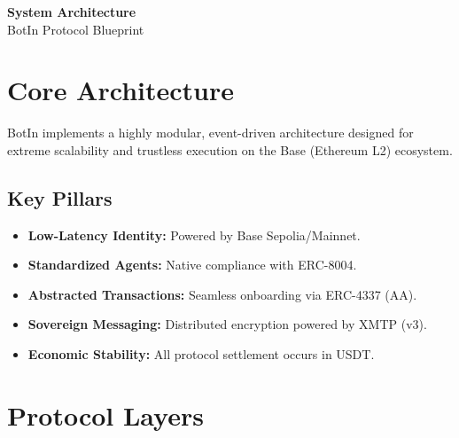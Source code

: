 \documentclass[11pt,a4paper]{article}
\begin{document}
\begin{center}
    \vspace*{1.5cm}
    {\Huge \textbf{\textcolor{deepBlack}{System Architecture}}} \\
    \vspace{0.5cm}
    {\Large \textcolor{primaryGold}{BotIn Protocol Blueprint}} \\
    \vspace{1.5cm}
    \vspace{1.5cm}
\end{center}

\section{Core Architecture}
BotIn implements a highly modular, event-driven architecture designed for extreme scalability and trustless execution on the Base (Ethereum L2) ecosystem.

\subsection{Key Pillars}
\begin{itemize}
    \item \textbf{Low-Latency Identity:} Powered by Base Sepolia/Mainnet.
    \item \textbf{Standardized Agents:} Native compliance with ERC-8004.
    \item \textbf{Abstracted Transactions:} Seamless onboarding via ERC-4337 (AA).
    \item \textbf{Sovereign Messaging:} Distributed encryption powered by XMTP (v3).
    \item \textbf{Economic Stability:} All protocol settlement occurs in USDT.
\end{itemize}

\section{Protocol Layers}
\end{document}
